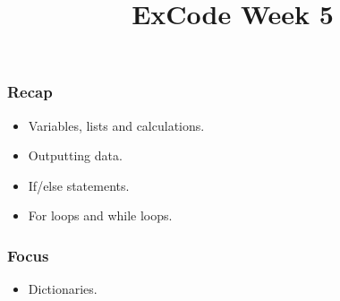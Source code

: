 \documentclass{beamer}
\title{ExCode Week 5}
\institute{University of Exeter}
\date{\displaydate{today}}
\begin{document}
\frame{\titlepage}

\begin{frame}
	\frametitle{Recap}

	\begin{itemize}
		\item{Variables, lists and calculations.}
		\item{Outputting data.}
		\item{If/else statements.}
		\item{For loops and while loops.}
	\end{itemize}
\end{frame}

\begin{frame}
	\frametitle{Focus}

	\begin{itemize}
		\item{Dictionaries.}
	\end{itemize}
\end{frame}
\end{document}
